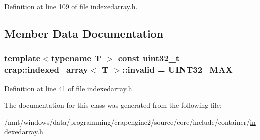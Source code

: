 Definition at line 109 of file indexedarray.\+h.



\subsection{Member Data Documentation}
\hypertarget{classcrap_1_1indexed__array_a547a4e2b6bf39bfc62f7e5017b93136e}{
\subsubsection[{invalid}]{\setlength{\rightskip}{0pt plus 5cm}template$<$typename T $>$ const uint32\+\_\+t {\bf crap\+::indexed\+\_\+array}$<$ T $>$\+::invalid = {\bf U\+I\+N\+T32\+\_\+\+M\+A\+X}\hspace{0.3cm}{\ttfamily [static]}}}\label{classcrap_1_1indexed__array_a547a4e2b6bf39bfc62f7e5017b93136e}


Definition at line 41 of file indexedarray.\+h.



The documentation for this class was generated from the following file\+:\begin{DoxyCompactItemize}
\item 
/mnt/windows/data/programming/crapengine2/source/core/include/container/\hyperlink{indexedarray_8h}{indexedarray.\+h}\end{DoxyCompactItemize}
